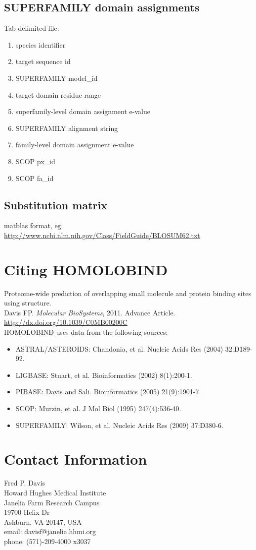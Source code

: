 \documentclass[11pt]{article}
\begin{document}
\subsection{SUPERFAMILY domain assignments}

Tab-delimited file:
\begin{enumerate}
\item species identifier
\item target sequence id
\item SUPERFAMILY model\_id
\item target domain residue range
\item superfamily-level domain assignment e-value
\item SUPERFAMILY alignment string
\item family-level domain assignment e-value
\item SCOP px\_id
\item SCOP fa\_id
\end{enumerate}

\subsection{Substitution matrix}
matblas format, eg: \url{http://www.ncbi.nlm.nih.gov/Class/FieldGuide/BLOSUM62.txt}

\section{Citing HOMOLOBIND}
Proteome-wide prediction of overlapping small molecule and protein binding sites using structure.\\
Davis FP. {\it Molecular BioSystems}, 2011. Advance Article. \url{http://dx.doi.org/10.1039/C0MB00200C}\\

HOMOLOBIND uses data from the following sources:
\begin{itemize}
\item ASTRAL/ASTEROIDS: Chandonia, et al. Nucleic Acids Res (2004) 32:D189-92.
\item LIGBASE: Stuart, et al. Bioinformatics (2002) 8(1):200-1.
\item PIBASE: Davis and Sali. Bioinformatics (2005) 21(9):1901-7.
\item SCOP: Murzin, et al. J Mol Biol (1995) 247(4):536-40.
\item SUPERFAMILY: Wilson, et al. Nucleic Acids Res (2009) 37:D380-6.
\end{itemize}

\section{Contact Information}
Fred P. Davis\\
Howard Hughes Medical Institute\\
Janelia Farm Research Campus\\
19700 Helix Dr\\
Ashburn, VA 20147, USA\\
email: davisf@janelia.hhmi.org\\
phone: (571)-209-4000 x3037
\end{document}
